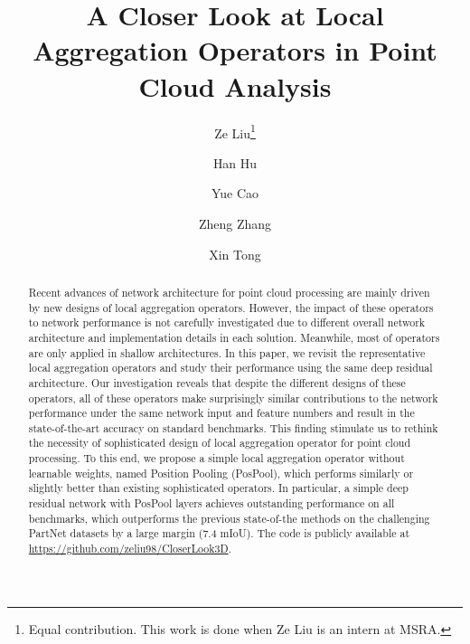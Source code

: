 \documentclass[runningheads]{llncs}
\begin{document}
\pagestyle{headings}
\mainmatter


\title{A Closer Look at Local Aggregation Operators in Point Cloud Analysis} 

\begin{comment}
\titlerunning{ECCV-20 submission ID \ECCVSubNumber}
\authorrunning{ECCV-20 submission ID \ECCVSubNumber}
\author{Anonymous ECCV submission}
\institute{Paper ID \ECCVSubNumber}
\end{comment}


\author{Ze Liu\thanks{Equal contribution. This work is done when Ze Liu is an intern at MSRA.} \and
Han Hu\inst{2\star} \and
Yue Cao \and Zheng Zhang \and Xin Tong}

\maketitle

\begin{abstract}
Recent advances of network architecture for point cloud processing are mainly driven by new designs of local aggregation operators. However, the impact of these operators to network performance is not carefully investigated due to different overall network architecture and implementation details in each solution. Meanwhile, most of operators are only applied in shallow architectures. In this paper, we revisit the representative local aggregation operators and study their performance using the same deep residual architecture. Our investigation reveals that despite the different designs of these operators, all of these operators make surprisingly similar contributions to the network performance under the same network input and feature numbers and result in the state-of-the-art accuracy on standard benchmarks. This finding stimulate us to rethink the necessity of sophisticated design of local aggregation operator for point cloud processing. To this end, we propose a simple local aggregation operator without learnable weights, named Position Pooling (PosPool), which performs similarly or slightly better than existing sophisticated operators. In particular, a simple deep residual network with PosPool layers achieves outstanding performance on all benchmarks, which outperforms the previous state-of-the methods on the challenging PartNet datasets by a large margin (7.4 mIoU). The code is publicly available at \url{https://github.com/zeliu98/CloserLook3D}.

\end{abstract}
\end{document}
